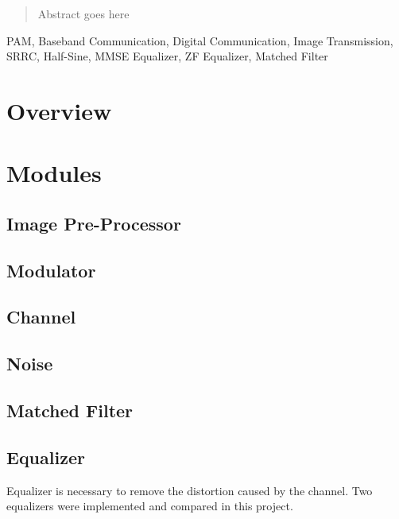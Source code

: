 \begin{abstract}
Abstract goes here
\end{abstract}

\begin{IEEEkeywords}
PAM, Baseband Communication, Digital Communication, Image Transmission, SRRC, Half-Sine, MMSE Equalizer, ZF Equalizer, Matched Filter
\end{IEEEkeywords}

\section{Overview}

\section{Modules}
\subsection{Image Pre-Processor}

\subsection{Modulator}

\subsection{Channel}

\subsection{Noise}

\subsection{Matched Filter}

\subsection{Equalizer}
Equalizer is necessary to remove the distortion caused by the channel. Two equalizers were implemented and compared in this project.



